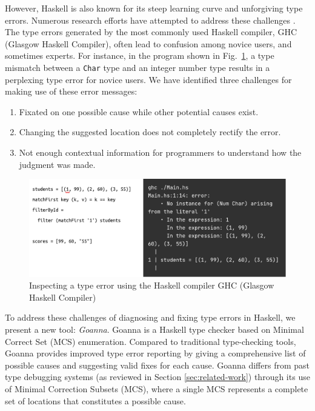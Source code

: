 However, Haskell is also known for its steep learning curve and unforgiving type errors. Numerous research efforts have attempted to address these challenges \cite{Tirronen2015-nr,Chen2014-dz, Heeren2003-kd,Zhang2015-xy, Lerner2007-mu,Zhang2017-tj}. The type errors generated by the most commonly used Haskell compiler, GHC (Glasgow Haskell Compiler), often lead to confusion among novice users, and sometimes experts. For instance, in the program shown in Fig.~\ref{fig:motivation}, a type mismatch between a {\tt Char} type and an integer number type results in a perplexing type error for novice users. We have identified three challenges for making use of these error messages:


    \begin{enumerate}
        \item Fixated on one possible cause while other potential causes exist.
        \item Changing the suggested location does not completely rectify the error.
        \item Not enough contextual information for programmers to understand how the judgment was made.

    \end{enumerate}


    \begin{figure}[ht!]
        \centering
        \includegraphics[width=\linewidth]{images/motivation}
        \caption{Inspecting a type error using the Haskell compiler GHC (Glasgow Haskell Compiler)}
        \label{fig:motivation}
    \end{figure}




    To address these challenges of diagnosing and fixing type errors in Haskell, we present a new tool: \textit{Goanna}. Goanna is a Haskell type checker based on Minimal Correct Set (MCS) enumeration. Compared to traditional type-checking tools, Goanna provides improved type error reporting by giving a comprehensive list of possible causes and suggesting valid fixes for each cause.  Goanna differs from past type debugging systems (as reviewed in Section \ref{sec:related-work}) through its use of Minimal Correction Subsets (MCS), where a single MCS represents a complete set of locations that constitutes a possible cause.


